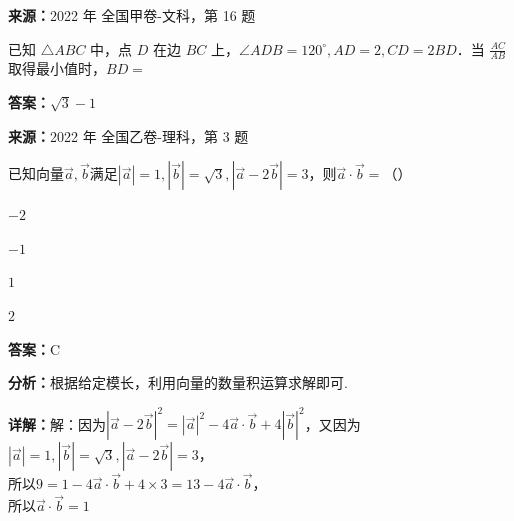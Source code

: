\begin{question}[points=5]
\textbf{来源：}2022 年 全国甲卷-文科，第 16 题\par
已知 $\triangle ABC$ 中，点 $D$ 在边 $BC$ 上，$\angle ADB=120^\circ, AD=2, CD=2BD$．当 $\frac{AC}{AB}$ 取得最小值时，$BD=$
\fillin[{$\sqrt{3}-1$}]
\begin{solution}
\textbf{答案：}$\sqrt{3}-1$
\end{solution}
\end{question}

\begin{question}[points=5]
\textbf{来源：}2022 年 全国乙卷-理科，第 3 题\par
已知向量$\vec{a}, \vec{b}$满足$|\vec{a}| = 1, |\vec{b}| = \sqrt{3}, |\vec{a} - 2\vec{b}| = 3$，则$\vec{a} \cdot \vec{b} =$（\qquad）
\begin{choices}
  \item $-2$
  \item $-1$
  \item $1$
  \item $2$
\end{choices}
\begin{solution}
\textbf{答案：}C

\textbf{分析：}根据给定模长，利用向量的数量积运算求解即可.

\textbf{详解：}解：因为$|\vec{a} - 2\vec{b}|^2 = |\vec{a}|^2 - 4\vec{a} \cdot \vec{b} + 4|\vec{b}|^2$，又因为$|\vec{a}| = 1, |\vec{b}| = \sqrt{3}, |\vec{a} - 2\vec{b}| = 3$，\\所以$9 = 1 - 4\vec{a} \cdot \vec{b} + 4 \times 3 = 13 - 4\vec{a} \cdot \vec{b}$，\\所以$\vec{a} \cdot \vec{b} = 1$
\end{solution}
\end{question}


